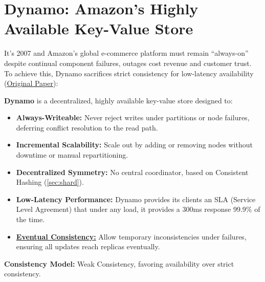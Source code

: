 \newpage

\section{Dynamo: Amazon's Highly Available Key-Value Store}
\label{sec:dynamo}

\noindent
It's 2007 and Amazon's global e-commerce platform must remain ``always-on'' despite continual component failures, outages cost 
revenue and customer trust. To achieve this, Dynamo sacrifices strict consistency for low-latency availability (\href{https://www.amazon.science/publications/dynamo-amazons-highly-available-key-value-store#:~:text=This%20paper%20presents%20the%20design%20and%20implementation%20of,availability%2C%20Dynamo%20sacrifices%20consistency%20under%20certain%20failure%20scenarios.}{Original Paper}):

\begin{Def}
    \textbf{Dynamo} is a decentralized, highly available key-value store designed to:
    \begin{itemize}
      \item \textbf{Always-Writeable:} Never reject writes under partitions or node failures, deferring conflict resolution to the read path.
      \item \textbf{Incremental Scalability:} Scale out by adding or removing nodes without downtime or manual repartitioning.
      \item \textbf{Decentralized Symmetry:} No central coordinator, based on Consistent Hashing (\ref{sec:shard}).
      \item \textbf{Low-Latency Performance:} Dynamo provides its clients an SLA (Service Level Agreement) that under any load, it provides 
      a 300ms response 99.9\% of the time.
      \item \underline{\textbf{Eventual Consistency:}} Allow temporary inconsistencies under failures, ensuring all updates reach replicas eventually.
    \end{itemize}
    \noindent
    \textbf{Consistency Model:} Weak Consistency, favoring availability over strict consistency.
  \end{Def}
  
